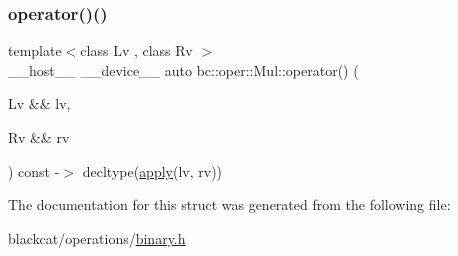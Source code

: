 \mbox{\label{structbc_1_1oper_1_1Mul_a3d575d27e79a8ae6e3628c2c6853fec0}} 
\subsubsection{\texorpdfstring{operator()()}{operator()()}}
{\footnotesize\ttfamily template$<$class Lv , class Rv $>$ \\
\+\_\+\+\_\+host\+\_\+\+\_\+ \+\_\+\+\_\+device\+\_\+\+\_\+ auto bc\+::oper\+::\+Mul\+::operator() (\begin{DoxyParamCaption}\item[{Lv \&\&}]{lv,  }\item[{Rv \&\&}]{rv }\end{DoxyParamCaption}) const -\/$>$ decltype(\hyperlink{structbc_1_1oper_1_1Mul_a92227363c70d4c198263cb4d8a3c063c}{apply}(lv, rv)) \hspace{0.3cm}{\ttfamily [inline]}}



The documentation for this struct was generated from the following file\+:\begin{DoxyCompactItemize}
\item 
blackcat/operations/\hyperlink{binary_8h}{binary.\+h}\end{DoxyCompactItemize}
